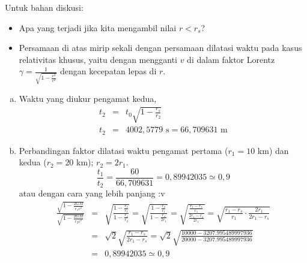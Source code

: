 \documentclass[11pt,fleqn]{exam}
\begin{document}
\begin{questions}
Untuk bahan diskusi:
\begin{itemize}
	\item Apa yang terjadi jika kita mengambil nilai $r < r_s$?
	\item Persamaan di atas mirip sekali dengan persamaan dilatasi waktu pada kasus relativitas khusus, yaitu dengan mengganti $v$ di dalam faktor Lorentz $\gamma = \frac{1}{\sqrt{1 - \frac{v^2}{c^2}}}$ dengan kecepatan lepas di $r$. 
\end{itemize}

\begin{enumerate}[a.]
	\item Waktu yang diukur pengamat kedua, 
	\begin{eqnarray*}
		t_2 &=& t_0 \sqrt{1 - \frac{r_s}{r_2}}\\
		t_2 &=& 4002,5779 \text{   s} = 66,709631 \text{   m}
	\end{eqnarray*}
	
	\item Perbandingan faktor dilatasi waktu pengamat pertama ($r_1 = 10$ km) dan kedua ($r_2 = 20$ km); $r_2 = 2r_1$. 
	\begin{equation*}
	\frac{t_1}{t_2} = \frac{60}{66,709631} = 0,89942035 \simeq 0,9
	\end{equation*} 
	atau dengan cara yang lebih panjang :v
	\begin{eqnarray*}
	\frac{\sqrt{1 - \frac{2GM}{r_1c^2}}}{\sqrt{1 - \frac{2GM}{r_2c^2}}} &=& \sqrt{ \frac{1 - \frac{r_s}{r_1}}{1 - \frac{r_s}{r_2}} } = \sqrt{ \frac{1 - \frac{r_s}{r_1}}{1 - \frac{r_s}{2 r_1}} } = \sqrt{ \frac{\frac{r_1 - r_s}{r_1}}{\frac{2r_1 - r_s}{2 r_1}} } = \sqrt{ \frac{r_1 - r_s}{r_1} \cdot \frac{2 r_1}{2r_1 - r_s} } \\ 
	&=& \sqrt{2} \sqrt{\frac{r_1 - r_s}{2r_1 - r_s}} =  \sqrt{2} \sqrt{\frac{10000 - 3207.995489997936}{20000 - 3207.995489997936}}\\
	&=& 0,89942035 \simeq 0,9
	\end{eqnarray*}
	

\end{enumerate}
\end{questions}
\end{document}
